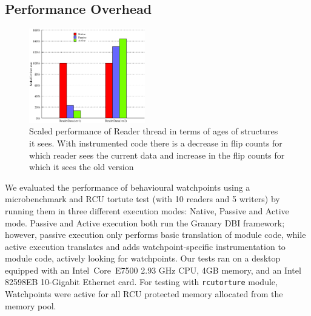 \subsection{Performance Overhead}
\begin{figure}
\centering
 	\includegraphics[width=0.45\textwidth]{rcu_rw}
\caption{Scaled performance of Reader thread in terms of ages of structures it sees. With instrumented code there is a decrease in flip counts for which reader sees the current data and increase in the flip counts for which it sees the old version}\label{fig:perf}
\end{figure}
We evaluated the performance of behavioural watchpoints using a microbenchmark and RCU tortute test (with 10 readers and 5 writers) by running them in three different execution modes: Native, Passive and Active mode. Passive and Active execution both run the Granary DBI framework; however, passive execution only performs basic translation of module code, while active execution translates and adds watchpoint-specific instrumentation to module code, actively looking for watchpoints.%
Our tests ran on a desktop equipped with an Intel\textregistered\ Core\texttrademark\ E7500 2.93 GHz CPU, 4GB memory, and an Intel 82598EB  10-Gigabit Ethernet card. %
For testing with \texttt{rcutorture} module, Watchpoints were active for all RCU protected memory allocated from the memory pool.

